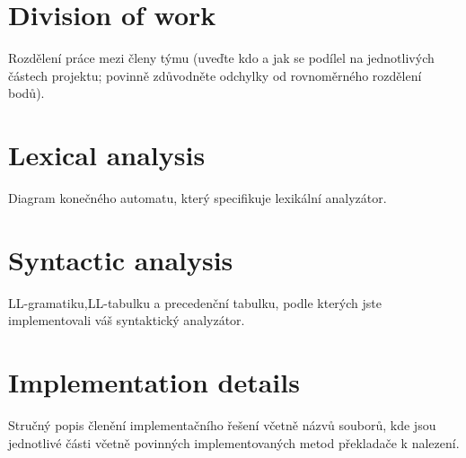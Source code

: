 \documentclass[11pt,a4paper]{article}
\begin{document}
    \section{Division of work}
    Rozdělení práce mezi členy týmu (uveďte kdo a jak se podílel na jednotlivých
    částech projektu; povinně zdůvodněte odchylky od rovnoměrného rozdělení bodů).

    \section{Lexical analysis}
    Diagram konečného automatu, který specifikuje lexikální analyzátor.

    \section{Syntactic analysis}
    LL-gramatiku,LL-tabulku a precedenční tabulku, podle kterých jste implementovali
    váš syntaktický analyzátor.

    \section{Implementation details}
    Stručný popis členění implementačního řešení včetně názvů souborů, kde jsou jednotlivé
    části včetně povinných implementovaných metod překladače k nalezení.
\end{document}
